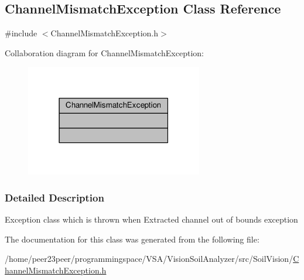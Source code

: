\hypertarget{class_channel_mismatch_exception}{}\subsection{Channel\+Mismatch\+Exception Class Reference}
\label{class_channel_mismatch_exception}


{\ttfamily \#include $<$Channel\+Mismatch\+Exception.\+h$>$}



Collaboration diagram for Channel\+Mismatch\+Exception\+:
\nopagebreak
\begin{figure}[H]
\begin{center}
\leavevmode
\includegraphics[width=219pt]{class_channel_mismatch_exception__coll__graph}
\end{center}
\end{figure}


\subsubsection{Detailed Description}
Exception class which is thrown when Extracted channel out of bounds exception 

The documentation for this class was generated from the following file\+:\begin{DoxyCompactItemize}
\item 
/home/peer23peer/programmingspace/\+V\+S\+A/\+Vision\+Soil\+Analyzer/src/\+Soil\+Vision/\hyperlink{_channel_mismatch_exception_8h}{Channel\+Mismatch\+Exception.\+h}\end{DoxyCompactItemize}
